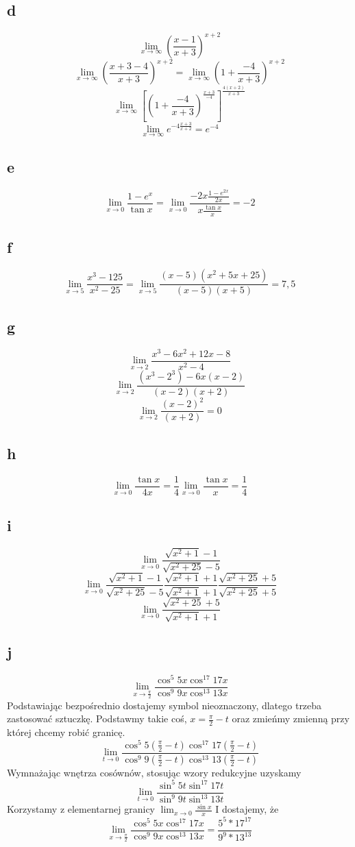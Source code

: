 \documentclass{article}
\begin{document}
\subsection{d}
$$\lim_{x \to \infty}{ \left( \frac{x-1}{x+3} \right) ^{x+2} }$$ 
$$\lim_{x \to \infty}{ \left( \frac{x+3-4}{x+3} \right) ^{x+2} } = 
\lim_{x \to \infty}{ \left( 1 + \frac{-4}{x+3} \right) ^{x+2} }$$
$$\lim_{x \to \infty}{\left[ \left( 1 + \frac{-4}{x+3} \right)^{\frac{x+3}{-4}} \right] ^{\frac{4(x+2)}{x+3}} } $$ 
$$\lim_{x \to \infty}{e^{-4\frac{x+3}{x+2}}} = e^{-4}$$
\subsection{e}
$$\lim_{x \to 0}{\frac{1-e^x}{\tan{x}}} = \lim_{x \to 0}{\frac{-2x\frac{1-e^{2x}}{2x}}{x\frac{\tan{x}}{x}}} = -2 $$
\subsection{f}
$$\lim_{x \to 5}{\frac{x^3 - 125}{x^2 - 25}} = \lim_{x \to 5}{\frac{(x-5)(x^2 + 5x + 25)}{(x-5)(x+5)}} = 7,5  $$

\subsection{g}
$$\lim_{x \to 2}{\frac{x^3 - 6x^2 + 12x - 8}{x^2 - 4}} $$
$$\lim_{x \to 2}{\frac{(x^3 - 2^3) - 6x(x - 2) }{(x - 2)(x+2)}} $$
$$\lim_{x \to 2}{\frac{(x-2)^2 }{(x+2)}} = 0 $$

\subsection{h}
$$\lim_{x \to 0}{\frac{\tan{x}}{4x}} = \frac{1}{4}\lim_{x \to 0}{\frac{\tan{x}}{x}} = \frac{1}{4} $$

\subsection{i}
$$\lim_{x \to 0}{\frac{\sqrt{x^2+1} - 1}{\sqrt{x^2 + 25} -5}} $$
$$\lim_{x \to 0}{\frac{\sqrt{x^2+1} - 1}{\sqrt{x^2 + 25} -5}}\frac{\sqrt{x^2+1} + 1}{\sqrt{x^2+1} + 1} \frac{\sqrt{x^2+25} + 5}{\sqrt{x^2+25} + 5} $$
$$\lim_{x \to 0}{\frac{\sqrt{x^2+25} + 5}{\sqrt{x^2+1} + 1}} $$

\subsection{j}
$$\lim_{x \to \frac{\pi}{2}}
{\frac{\cos^5{5x}\cos^{17}{17x}}{\cos^9{9x}\cos^{13}{13x}}} $$
Podstawiając bezpośrednio dostajemy symbol nieoznaczony, dlatego trzeba zastosować sztuczkę. Podstawmy takie coś, $ x = \frac{\pi}{2} -t $ oraz zmieńmy zmienną przy której chcemy robić granicę.
$$\lim_{t \to 0}
{\frac{\cos^5{5(\frac{\pi}{2} -t)}\cos^{17}{17(\frac{\pi}{2} -t)}}{\cos^9{9(\frac{\pi}{2} -t)}\cos^{13}{13(\frac{\pi}{2} -t)}}} $$
Wymnażając wnętrza cosównów, stosując wzory redukcyjne uzyskamy
$$\lim_{t \to 0}
{\frac{\sin^5{5t}\sin^{17}{17t}}{\sin^9{9t}\sin^{13}{13t}}} $$
Korzystamy z elementarnej granicy $\lim_{x \to 0}{\frac{\sin{x}}{x}} $
I dostajemy, że
$$\lim_{x \to \frac{\pi}{2}}
{\frac{\cos^5{5x}\cos^{17}{17x}}{\cos^9{9x}\cos^{13}{13x}}} = \frac{5^5 * 17^{17}}{9^9 * 13^{13}} $$
\end{document}
